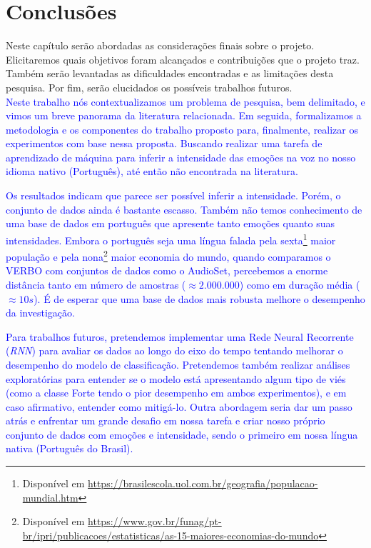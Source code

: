 \chapter{Conclusões}\label{Cap:Conclusoes}

Neste capítulo serão abordadas as considerações finais sobre o projeto. Elicitaremos quais objetivos foram alcançados e contribuições que o projeto traz. Também serão levantadas
as dificuldades encontradas e as limitações desta pesquisa. Por fim, serão elucidados os
possíveis trabalhos futuros.\\

\textcolor{blue}{Neste trabalho nós contextualizamos um problema de pesquisa, bem delimitado, e vimos um breve panorama da literatura relacionada. Em seguida, formalizamos a metodologia e os componentes do trabalho proposto para, finalmente, realizar os experimentos com base nessa proposta. Buscando realizar uma tarefa de aprendizado de máquina para inferir a intensidade das emoções na voz no nosso idioma nativo (Português), até então não encontrada na literatura.}

\textcolor{blue}{Os resultados indicam que parece ser possível inferir a intensidade. Porém, o conjunto de dados ainda é bastante escasso. Também não temos conhecimento de uma base de dados em português que apresente tanto emoções quanto suas intensidades. Embora o português seja uma língua falada pela sexta\footnote{Disponível em \url{https://brasilescola.uol.com.br/geografia/populacao-mundial.htm}} maior população e pela nona\footnote{Disponível em \url {https://www.gov.br/funag/pt-br/ipri/publicacoes/estatisticas/as-15-maiores-economias-do-mundo}} maior economia do mundo, quando comparamos o VERBO com conjuntos de dados como o AudioSet, percebemos a enorme distância tanto em número de amostras ($\approx 2.000.000$) como em duração média ($\approx 10s$). É de esperar que uma base de dados mais robusta melhore o desempenho da investigação.}


\textcolor{blue}{Para trabalhos futuros, pretendemos implementar uma Rede Neural Recorrente (\textit{RNN}) para avaliar os dados ao longo do eixo do tempo tentando melhorar o desempenho do modelo de classificação. Pretendemos também realizar análises exploratórias para entender se o modelo está apresentando algum tipo de viés (como a classe Forte tendo o pior desempenho em ambos experimentos), e em caso afirmativo, entender como mitigá-lo. Outra abordagem seria dar um passo atrás e enfrentar um grande desafio em nossa tarefa e criar nosso próprio conjunto de dados com emoções e intensidade, sendo o primeiro em nossa língua nativa (Português do Brasil).}

